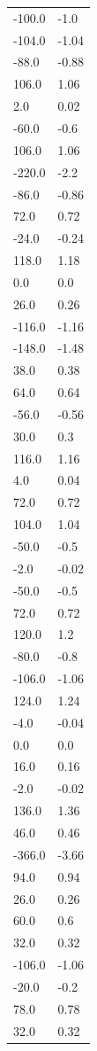 \begin{longtable}{ll}
-100.0 & -1.0 \\
-104.0 & -1.04 \\
-88.0 & -0.88 \\
106.0 & 1.06 \\
2.0 & 0.02 \\
-60.0 & -0.6 \\
106.0 & 1.06 \\
-220.0 & -2.2 \\
-86.0 & -0.86 \\
72.0 & 0.72 \\
-24.0 & -0.24 \\
118.0 & 1.18 \\
0.0 & 0.0 \\
26.0 & 0.26 \\
-116.0 & -1.16 \\
-148.0 & -1.48 \\
38.0 & 0.38 \\
64.0 & 0.64 \\
-56.0 & -0.56 \\
30.0 & 0.3 \\
116.0 & 1.16 \\
4.0 & 0.04 \\
72.0 & 0.72 \\
104.0 & 1.04 \\
-50.0 & -0.5 \\
-2.0 & -0.02 \\
-50.0 & -0.5 \\
72.0 & 0.72 \\
120.0 & 1.2 \\
-80.0 & -0.8 \\
-106.0 & -1.06 \\
124.0 & 1.24 \\
-4.0 & -0.04 \\
0.0 & 0.0 \\
16.0 & 0.16 \\
-2.0 & -0.02 \\
136.0 & 1.36 \\
46.0 & 0.46 \\
-366.0 & -3.66 \\
94.0 & 0.94 \\
26.0 & 0.26 \\
60.0 & 0.6 \\
32.0 & 0.32 \\
-106.0 & -1.06 \\
-20.0 & -0.2 \\
78.0 & 0.78 \\
32.0 & 0.32 \\

\end{longtable}
